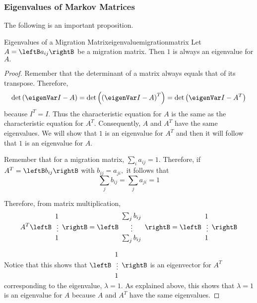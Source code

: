 \subsubsection{Eigenvalues of Markov Matrices}

The following is an important proposition.

\begin{proposition}{Eigenvalues of a Migration Matrix}{eigenvaluemigrationmatrix}
Let $A=\leftB a_{ij}\rightB $ be a migration matrix. Then $1$ is always an
eigenvalue for $A.$
\end{proposition}

\begin{proof} Remember that the determinant of a matrix always equals that of its transpose. 
Therefore,
\begin{equation*}
\det \left( \eigenVar I - A\right) =\det \left( \left( \eigenVar I - A\right)
^{T}\right) =\det \left( \eigenVar I - A^T\right)
\end{equation*}
because $I^{T}=I.$ Thus the characteristic equation for $A$ is the same as
the characteristic equation for $A^{T}$. Consequently, $A$ and $A^{T}$ have the same
eigenvalues. We will show that $1$ is an eigenvalue for $A^{T}$ and then it
will follow that $1$ is an eigenvalue for $A$.

Remember that for a migration matrix, $\sum_{i}a_{ij}=1.$ Therefore, if 
$A^{T}=\leftB b_{ij}\rightB $ with $b_{ij}=a_{ji},$ it follows that
\begin{equation*}
\sum_{j}b_{ij}=\sum_{j}a_{ji}=1
\end{equation*}

Therefore, from matrix multiplication,
\begin{equation*}
A^{T}\leftB
\begin{array}{r}
1 \\
\vdots \\
1
\end{array}
\rightB =\leftB
\begin{array}{c}
\sum_{j}b_{ij} \\
\vdots \\
\sum_{j}b_{ij}
\end{array}
\rightB =\leftB
\begin{array}{r}
1 \\
\vdots \\
1
\end{array}
\rightB
\end{equation*}

Notice that this shows that $\leftB
\begin{array}{r}
1 \\
\vdots \\
1
\end{array}
\rightB $ is an eigenvector for $A^{T}$ corresponding to the eigenvalue, $\lambda =1.$
 As explained above, this shows that $\lambda =1$ is an
eigenvalue for $A$ because $A$ and $A^{T}$ have the same eigenvalues. 
\end{proof}